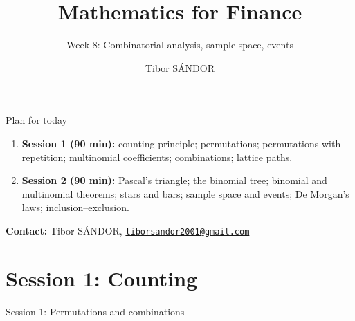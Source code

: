 \documentclass[aspectratio=169,11pt,usepdftitle=false]{beamer}
\title[Mathematics for Finance]{Mathematics for Finance}
\author{Tibor SÁNDOR}
\subtitle{Week 8: Combinatorial analysis, sample space, events}
\institute{Corvinus University of Budapest\\[2pt]
  \href{mailto:\myemail}{\texttt{\myemail}}}
\makeatletter
\newcommand{\myemail}{tiborsandor2001@gmail.com}
\makeatother
\begin{document}
\begin{frame}
	\titlepage
\end{frame}

\begin{frame}{Plan for today}
	\begin{enumerate}
		\item \textbf{Session 1 (90 min):} counting principle; permutations;
		      permutations with repetition; multinomial coefficients;
		      combinations; lattice paths.
		\item \textbf{Session 2 (90 min):} Pascal's triangle; the binomial tree;
		      binomial and multinomial theorems; stars and bars;
		      sample space and events; De Morgan's laws; inclusion--exclusion.
	\end{enumerate}
	\vspace{.3cm}
	\textbf{Contact:} Tibor SÁNDOR,
	\href{mailto:\myemail}{\texttt{\myemail}}
\end{frame}

\section{Session 1: Counting}

\begin{frame}
	\centering\Large\color{navy}Session 1: Permutations and combinations
\end{frame}
\end{document}
